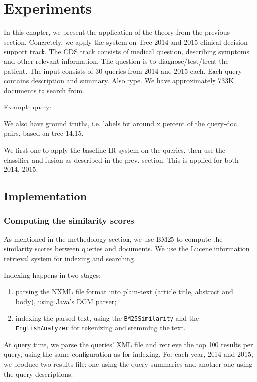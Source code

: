 \chapter{Experiments}

In this chapter, we present the application of the theory from the previous section. Concretely, we apply the system on Trec 2014 and 2015
clinical decision support track. 
The CDS track consists of medical question, describing symptoms and other relevant information. The question is to diagnose/test/treat
the patient.
The input consists of 30 queries from 2014 and 2015 each. Each query contains description and summary. Also type.
We have approximately 733K documents to search from.

Example query:

We also have ground truths, i.e. labels for around x percent of the query-doc pairs, based on trec 14,15. 

We first one to apply the baseline IR system on the queries, then use the classifier and fusion as described in the prev. section.
This is applied for both 2014, 2015.

\section{Implementation}

\subsection{Computing the similarity scores}
As mentioned in the methodology section, we use BM25 to compute the similarity scores between queries and documents.
We use the Lucene information retrieval system for indexing and searching.

Indexing happens in two stages:
\begin{enumerate}
 \item parsing the NXML file format into plain-text (article title, abstract and body), using Java's DOM parser;
 \item indexing the parsed text, using the \texttt{BM25Similarity} and the \texttt{EnglishAnalyzer} for tokenizing and stemming the text.
\end{enumerate}

At query time, we parse the queries' XML file and retrieve the top 100 results per query, using the same configuration as for indexing.
For each year, 2014 and 2015, we produce two results file: one using the query summaries and another one using the query descriptions.


